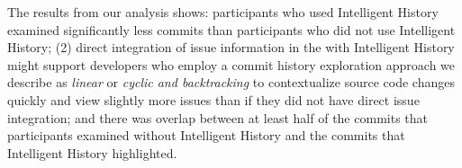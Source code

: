 The results from our analysis shows:
 participants who used Intelligent History examined significantly
less commits than participants who did not use Intelligent History;
(2) direct integration of issue information in the 
with Intelligent History might support developers who employ a commit history exploration approach
we describe as \textit{linear} or \textit{cyclic and backtracking} to contextualize
source code changes quickly and view slightly more issues than if they did not have
direct issue integration; and
 there was overlap between at least half of the commits
that participants examined without Intelligent History and the commits that Intelligent History
highlighted.

